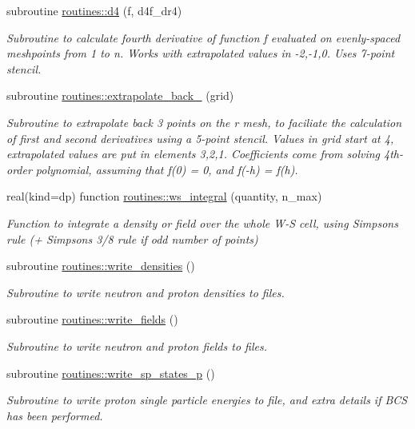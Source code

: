 \begin{DoxyCompactItemize}
subroutine \mbox{\hyperlink{namespaceroutines_a6d38e9b19f2e939feb7840d2575fbb56}{routines\+::d4}} (f, d4f\+\_\+dr4)
\begin{DoxyCompactList}\small\item\em Subroutine to calculate fourth derivative of function f evaluated on evenly-\/spaced meshpoints from 1 to n. Works with extrapolated values in -\/2,-\/1,0. Uses 7-\/point stencil. \end{DoxyCompactList}\item 
subroutine \mbox{\hyperlink{namespaceroutines_af143340288720f8019e944ec7110a84e}{routines\+::extrapolate\+\_\+back\+\_}} (grid)
\begin{DoxyCompactList}\small\item\em Subroutine to extrapolate back 3 points on the r mesh, to faciliate the calculation of first and second derivatives using a 5-\/point stencil. Values in grid start at 4, extrapolated values are put in elements 3,2,1. Coefficients come from solving 4th-\/order polynomial, assuming that f\textquotesingle{}(0) = 0, and f(-\/h) = f(h). \end{DoxyCompactList}\item 
real(kind=dp) function \mbox{\hyperlink{namespaceroutines_a5737b4327dcaa959a9ee519e4fca42e8}{routines\+::ws\+\_\+integral}} (quantity, n\+\_\+max)
\begin{DoxyCompactList}\small\item\em Function to integrate a density or field over the whole W-\/S cell, using Simpson\textquotesingle{}s rule (+ Simpson\textquotesingle{}s 3/8 rule if odd number of points) \end{DoxyCompactList}\item 
subroutine \mbox{\hyperlink{namespaceroutines_a81e61269fb96b5478fd7140a1f185ec1}{routines\+::write\+\_\+densities}} ()
\begin{DoxyCompactList}\small\item\em Subroutine to write neutron and proton densities to files. \end{DoxyCompactList}\item 
subroutine \mbox{\hyperlink{namespaceroutines_a4a59953c814b7fa48f2c4bf31d1763a2}{routines\+::write\+\_\+fields}} ()
\begin{DoxyCompactList}\small\item\em Subroutine to write neutron and proton fields to files. \end{DoxyCompactList}\item 
subroutine \mbox{\hyperlink{namespaceroutines_ad51ac6c5da6056a5346d7b15b3fbe7b4}{routines\+::write\+\_\+sp\+\_\+states\+\_\+p}} ()
\begin{DoxyCompactList}\small\item\em Subroutine to write proton single particle energies to file, and extra details if B\+CS has been performed. \end{DoxyCompactList}\end{DoxyCompactItemize}
